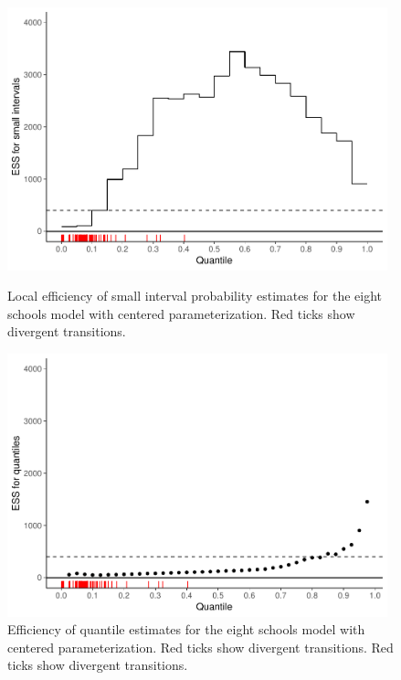 \documentclass[american,]{article}
\begin{document}
\begin{figure}[tp]
  \centering
  \begin{minipage}{0.48\textwidth}
  \includegraphics[width=0.98\textwidth]{graphics/local-ess-fit-cp-1.pdf}
  \caption{Local efficiency of small interval probability estimates for the eight  
  schools model with centered parameterization. Red ticks show divergent transitions.}
  \label{fig:local-ess-fit-cp-1}
\end{minipage}
\hfill
  \begin{minipage}{0.48\textwidth}
  \includegraphics[width=0.98\textwidth]{graphics/quantile-ess-fit-cp-1.pdf}
  \caption{Efficiency of quantile estimates for the eight schools model with 
  centered parameterization. Red ticks show divergent transitions. Red ticks 
  show divergent transitions.}
  \label{fig:quantile-ess-fit-cp-1}
 \end{minipage}
\end{figure}
\end{document}

